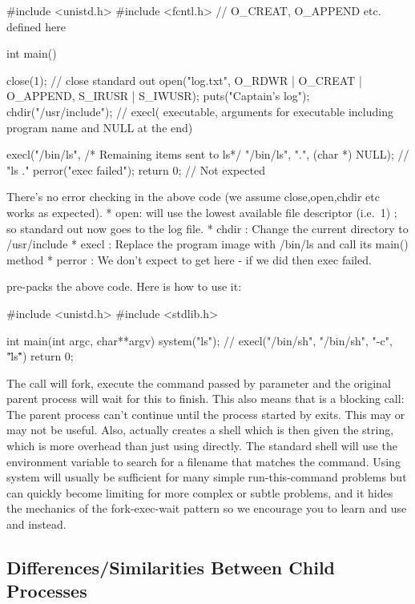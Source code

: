 \begin{code}[language=C]
#include <unistd.h>
#include <fcntl.h> // O_CREAT, O_APPEND etc. defined here

int main() {
   close(1); // close standard out
   open("log.txt", O_RDWR | O_CREAT | O_APPEND, S_IRUSR | S_IWUSR);
   puts("Captain's log");
   chdir("/usr/include");
   // execl( executable,  arguments for executable including program name and NULL at the end)

   execl("/bin/ls", /* Remaining items sent to ls*/ "/bin/ls", ".", (char *) NULL); // "ls ."
   perror("exec failed");
   return 0; // Not expected
}
\end{code}

There's no error checking in the above code (we assume close,open,chdir etc works as expected). * open: will use the lowest available file descriptor (i.e.~1) ; so standard out now goes to the log file. * chdir : Change the current directory to /usr/include * execl : Replace the program image with /bin/ls and call its main() method * perror : We don't expect to get here - if we did then exec failed.

 pre-packs the above code. Here is how to use it:

\begin{code}[language=C]

#include <unistd.h>
#include <stdlib.h>

int main(int argc, char**argv) {
  system("ls"); // execl("/bin/sh", "/bin/sh", "-c", "\"ls\"")
  return 0;
}
\end{code}

The  call will fork, execute the command passed by parameter and the original parent process will wait for this to finish. This also means that  is a blocking call: The parent process can't continue until the process started by  exits. This may or may not be useful. Also,  actually creates a shell which is then given the string, which is more overhead than just using  directly. The standard shell will use the  environment variable to search for a filename that matches the command. Using system will usually be sufficient for many simple run-this-command problems but can quickly become limiting for more complex or subtle problems, and it hides the mechanics of the fork-exec-wait pattern so we encourage you to learn and use   and  instead.

\subsection{Differences/Similarities Between Child Processes}

